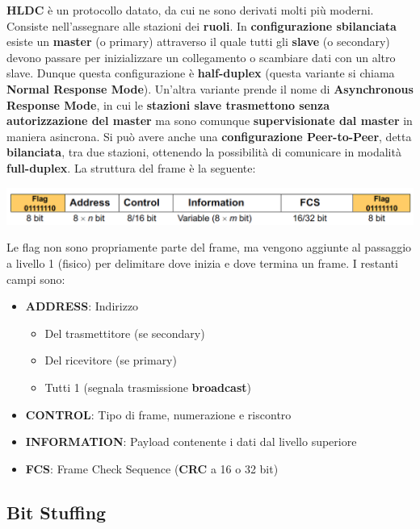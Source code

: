 \documentclass[12pt]{article}
\begin{document}
\textbf{HLDC} è un protocollo datato, da cui ne sono derivati molti più moderni. Consiste nell'assegnare alle stazioni dei \textbf{ruoli}. In \textbf{configurazione sbilanciata} esiste un \textbf{master} (o primary) attraverso il quale tutti gli \textbf{slave} (o secondary) devono passare per inizializzare un collegamento o scambiare dati con un altro slave. Dunque questa configurazione è \textbf{half-duplex} (questa variante si chiama \textbf{Normal Response Mode}). Un'altra variante prende il nome di \textbf{Asynchronous Response Mode}, in cui le \textbf{stazioni slave trasmettono senza autorizzazione del master} ma sono comunque \textbf{supervisionate dal master} in maniera asincrona. Si può avere anche una \textbf{configurazione Peer-to-Peer}, detta \textbf{bilanciata}, tra due stazioni, ottenendo la possibilità di comunicare in modalità \textbf{full-duplex}. La struttura del frame è la seguente:
\begin{center}
    \includegraphics[scale=0.35]{hldc_frame}
\end{center}
Le flag non sono propriamente parte del frame, ma vengono aggiunte al passaggio a livello 1 (fisico) per delimitare dove inizia e dove termina un frame. I restanti campi sono:
\begin{itemize}
    \item \textbf{ADDRESS}: Indirizzo
    \begin{itemize}
        \item Del trasmettitore (se secondary)
        \item Del ricevitore (se primary)
        \item Tutti 1 (segnala trasmissione \textbf{broadcast})
    \end{itemize}
    \item \textbf{CONTROL}: Tipo di frame, numerazione e riscontro
    \item \textbf{INFORMATION}: Payload contenente i dati dal livello superiore
    \item \textbf{FCS}: Frame Check Sequence (\textbf{CRC} a 16 o 32 bit)
\end{itemize}

\subsection{Bit Stuffing}
\end{document}
